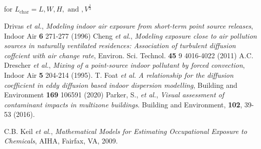 \documentclass[]{article}
\begin{document}
\noindent for $L_{\text{char}} = L, W, H, \text{ and }, V^{\frac{1}{3}}$\

\begin{thebibliography}{10}
     Drivas \emph{et al.}, \emph{Modeling indoor air exposure from
    short-term point source releases}, Indoor Air \textbf{6}
271-277 (1996)
 Cheng \emph{et al.}, \emph{Modeling exposure close to air pollution
sources in naturally ventilated residences: Association of turbulent diffusion
coffcient with air change rate}, Environ. Sci. Technol. \textbf{45} 9
4016-4022 (2011)
     A.C. Drescher \emph{et al.}, \emph{Mixing of a point-source
    indoor pollutant by forced convection}, Indoor Air \textbf{5}
    204-214 (1995).
     T. Foat \emph{et al.} \emph{A relationship for the diffusion coefficient
    in eddy diffusion based indoor dispersion modelling}, Building and
    Environment \textbf{169} 106591 (2020) 
     Parker, S., \emph{et al.}, \emph{Visual assessment
    of contaminant impacts in multizone buildings}. Building and Environment,
    \textbf{102}, 39-53 (2016).  
    
     C.B. Keil \emph{et al.}, \emph{Mathematical Models for Estimating
Occupational Exposure to Chemicals}, AIHA, Fairfax, VA, 2009.
\end{thebibliography}
\end{document}
